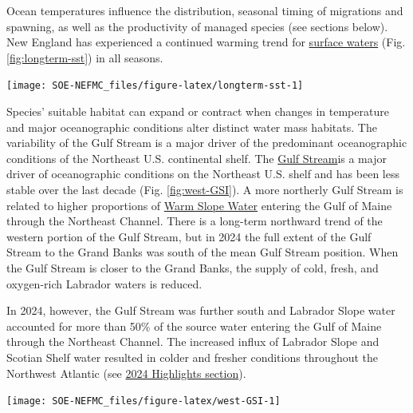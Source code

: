 \documentclass[
  10pt,
]{article}
\let\origfigure\figure
\let\endorigfigure\endfigure
\renewenvironment{figure}[1][2] {
    \expandafter\origfigure\expandafter[H]
} {
    \endorigfigure
}
\begin{document}
Ocean temperatures influence the distribution, seasonal timing of migrations and spawning, as well as the productivity of managed species (see sections below). New England has experienced a continued warming trend for \href{https://noaa-edab.github.io/catalog/seasonal_oisst_anom.html}{surface waters} (Fig.\ref{fig:longterm-sst}) in all seasons.

\begin{figure}

{\centering \texttt{[image: SOE-NEFMC\_files/figure-latex/longterm-sst-1]} 

}

\caption{Mean sea surface temperature across the entire Mid-Atlantic shelf.}\label{fig:longterm-sst}
\end{figure}

Species' suitable habitat can expand or contract when changes in temperature and major oceanographic conditions alter distinct water mass habitats. The variability of the Gulf Stream is a major driver of the predominant oceanographic conditions of the Northeast U.S. continental shelf. The \href{https://noaa-edab.github.io/catalog/gsi.html}{Gulf Stream}is a major driver of oceanographic conditions on the Northeast U.S. shelf and has been less stable over the last decade (Fig. \ref{fig:west-GSI}). A more northerly Gulf Stream is related to higher proportions of \href{https://noaa-edab.github.io/catalog/slopewater.html}{Warm Slope Water} entering the Gulf of Maine through the Northeast Channel. There is a long-term northward trend of the western portion of the Gulf Stream, but in 2024 the full extent of the Gulf Stream to the Grand Banks was south of the mean Gulf Stream position. When the Gulf Stream is closer to the Grand Banks, the supply of cold, fresh, and oxygen-rich Labrador waters is reduced.

In 2024, however, the Gulf Stream was further south and Labrador Slope water accounted for more than 50\% of the source water entering the Gulf of Maine through the Northeast Channel. The increased influx of Labrador Slope and Scotian Shelf water resulted in colder and fresher conditions throughout the Northwest Atlantic (see \protect\hyperlink{highlights}{2024 Highlights section}).

\begin{figure}

{\centering \texttt{[image: SOE-NEFMC\_files/figure-latex/west-GSI-1]} 

}

\caption{Index representing changes in the location of the western Gulf Stream north wall. Positive values represent a more northerly Gulf Stream position.}\label{fig:west-GSI}
\end{figure}
\end{document}
